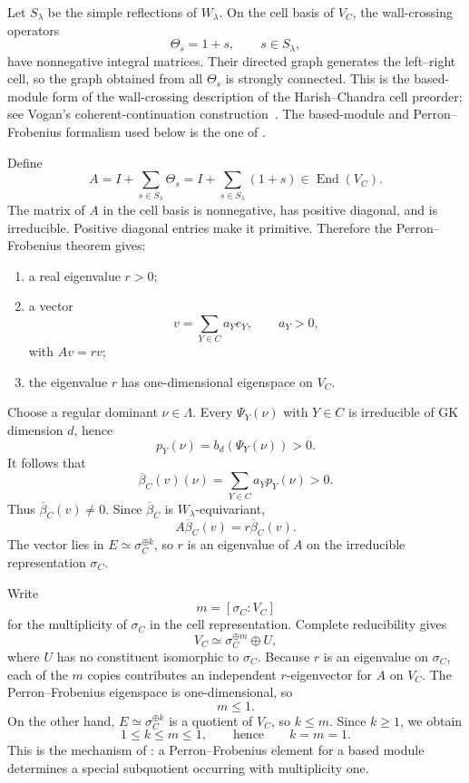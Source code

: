 Let $S_\lambda$ be the simple reflections of $W_\lambda$. On the cell basis
of $V_C$, the wall-crossing operators
\[
  \Theta_s = 1 + s, \qquad s \in S_\lambda,
\]
have nonnegative integral matrices. Their directed graph generates the
left--right cell, so the graph obtained from all $\Theta_s$ is strongly
connected. This is the based-module form of the wall-crossing description of
the Harish--Chandra cell preorder; see Vogan's coherent-continuation
construction~\cite{Vogan1981}. The based-module and Perron--Frobenius
formalism used below is the one of \cite[\S5.1]{KildetoftMazorchuk2016}.

Define
\[
  A = I + \sum_{s \in S_\lambda} \Theta_s
    = I + \sum_{s \in S_\lambda} (1+s) \in \operatorname{End}(V_C).
\]
The matrix of $A$ in the cell basis is nonnegative, has positive diagonal,
and is irreducible. Positive diagonal entries make it primitive. Therefore
the Perron--Frobenius theorem gives:
\begin{enumerate}
  \item a real eigenvalue $r > 0$;
  \item a vector
    \[
      v = \sum_{Y \in C} a_Y e_Y,
      \qquad a_Y > 0,
    \]
    with $Av = rv$;
  \item the eigenvalue $r$ has one-dimensional eigenspace on $V_C$.
\end{enumerate}

Choose a regular dominant $\nu \in \Lambda$. Every $\Psi_Y(\nu)$ with
$Y \in C$ is irreducible of GK dimension $d$, hence
\[
  p_Y(\nu) = b_d(\Psi_Y(\nu)) > 0.
\]
It follows that
\[
  \overline\beta_C(v)(\nu) = \sum_{Y \in C} a_Y p_Y(\nu) > 0.
\]
Thus $\overline\beta_C(v) \neq 0$. Since $\overline\beta_C$ is
$W_\lambda$-equivariant,
\[
  A \overline\beta_C(v) = r \overline\beta_C(v).
\]
The vector lies in $E \simeq \sigma_C^{\oplus k}$, so $r$ is an eigenvalue of
$A$ on the irreducible representation $\sigma_C$.

Write
\[
  m = [\sigma_C : V_C]
\]
for the multiplicity of $\sigma_C$ in the cell representation. Complete
reducibility gives
\[
  V_C \simeq \sigma_C^{\oplus m} \oplus U,
\]
where $U$ has no constituent isomorphic to $\sigma_C$. Because $r$ is an
eigenvalue on $\sigma_C$, each of the $m$ copies contributes an independent
$r$-eigenvector for $A$ on $V_C$. The Perron--Frobenius eigenspace is
one-dimensional, so
\[
  m \leq 1.
\]
On the other hand, $E \simeq \sigma_C^{\oplus k}$ is a quotient of $V_C$, so
$k \leq m$. Since $k \geq 1$, we obtain
\[
  1 \leq k \leq m \leq 1,
  \qquad \text{hence} \qquad
  k = m = 1.
\]
This is the mechanism of \cite[Cor.~5.1]{KildetoftMazorchuk2016}: a
Perron--Frobenius element for a based module determines a special
subquotient occurring with multiplicity one.

